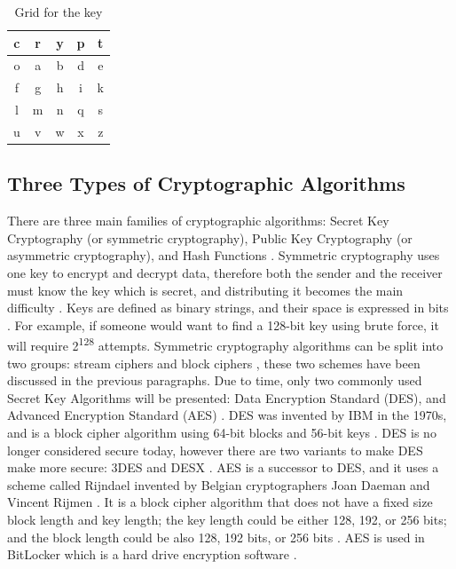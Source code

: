 \documentclass{l4proj}
\begin{document}
    \begin{table}[]
    \centering
    \begin{tabular}{|c|c|c|c|c|}
        \hline
        c & r & y & p & t \\
        \hline
        o & a & b & d & e \\
        \hline
        f & g & h & i & k \\
        \hline
        l & m & n & q & s \\
        \hline
        u & v & w & x & z \\
        \hline
    \end{tabular}
    \caption{Grid for the key}\label{tab:key}
    \end{table}

\subsection{Three Types of Cryptographic Algorithms}

There are three main families of cryptographic algorithms: Secret Key Cryptography (or symmetric cryptography), Public Key Cryptography (or asymmetric cryptography), and
Hash Functions \citep{kessler_overview_2016} \citep{savage_cse_2019}. Symmetric cryptography uses one key to encrypt and decrypt data, therefore both the sender and the 
receiver must know the key which is secret, and distributing it becomes the main difficulty \citep{kessler_overview_2016}. Keys are defined as binary strings, 
and their space is expressed in bits \citep{savage_cse_2019}. 
For example, if someone would want to find a 128-bit key using brute force, it will require 2\textsuperscript{128} attempts. 
Symmetric cryptography algorithms can be split into two groups: stream ciphers and block ciphers \citep{kessler_overview_2016}, 
these two schemes have been discussed in the previous paragraphs. 
Due to time, only two commonly used Secret Key Algorithms will be presented: Data Encryption Standard (DES), and Advanced Encryption Standard (AES) \citep{kessler_overview_2016}. 
DES was invented by IBM in the 1970s, and is a block cipher algorithm using 64-bit blocks and 56-bit keys \citep{kessler_overview_2016}. 
DES is no longer considered secure today, however there are two variants to make DES make more secure: 3DES and DESX \citep{kessler_overview_2016}.
AES is a successor to DES, and it uses a scheme called Rijndael invented by Belgian cryptographers Joan Daeman and Vincent Rijmen \citep{kessler_overview_2016}.
It is a block cipher algorithm that does not have a fixed size block length and key length; the key length could be either 128, 192, or 256 bits;
and the block length could be also 128, 192 bits, or 256 bits \citep{kessler_overview_2016}. AES is used in BitLocker which is a hard drive encryption software \citep{microsoft_bitlocker_2019}.
\end{document}
